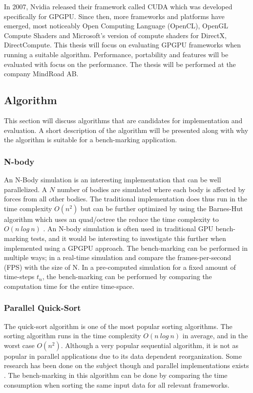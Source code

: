 \documentclass{article}
\begin{document}
In 2007, Nvidia released their framework called CUDA which was developed specifically for GPGPU. Since then, more frameworks and platforms have emerged, most noticeably Open Computing Language (OpenCL), OpenGL Compute Shaders and Microsoft's version of compute shaders for DirectX, DirectCompute. This thesis will focus on evaluating GPGPU frameworks when running a suitable algorithm. Performance, portability and features will be evaluated with focus on the performance. The thesis will be performed at the company MindRoad AB.

\subsection{Algorithm}
This section will discuss algorithms that are candidates for implementation and evaluation. A short description of the algorithm will be presented along with why the algorithm is suitable for a bench-marking application.

\subsubsection{N-body}
An N-Body simulation is an interesting implementation that can be well parallelized. A $N$ number of bodies are simulated where each body is affected by forces from all other bodies. The traditional implementation does thus run in the time complexity $O(n^2)$ but can be further optimized by using the Barnes-Hut algorithm which uses an quad/octree the reduce the time complexity to $O(n \ log \ n)$ \cite{barnes1986hierarchical}. An N-body simulation is often used in traditional GPU bench-marking tests, and it would be interesting to investigate this further when implemented using a GPGPU approach. The bench-marking can be performed in multiple ways; in a real-time simulation and compare the frames-per-second (FPS) with the size of N. In a pre-computed simulation for a fixed amount of time-steps $t_n$, the bench-marking can be performed by comparing the computation time for the entire time-space.


\subsubsection{Parallel Quick-Sort}
The quick-sort algorithm is one of the most popular sorting algorithms. The sorting algorithm runs in the time complexity  $O(n \ log \ n)$ in average, and in the worst case  $O(n^2)$. Although a very popular sequential algorithm, it is not as popular in parallel applications due to its data dependent reorganization. Some research has been done on the subject though and parallel implementations exists \cite{sanders1997efficient}\cite{tsigas2003simple}\cite{manca2016cuda}. The bench-marking in this algorithm can be done by comparing the time consumption when sorting the same input data for all relevant frameworks.
\end{document}
